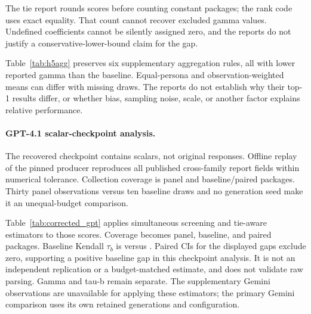The tie report rounds scores before counting constant packages; the rank code uses exact
equality. That count cannot recover excluded gamma values. Undefined coefficients cannot be
silently assigned zero, and the reports do not justify a conservative-lower-bound claim for the gap.

Table~\ref{tab:h5agg} preserves six supplementary aggregation rules, all with lower reported gamma
than the baseline. Equal-persona and observation-weighted means can differ with missing draws.
The reports do not establish why their top-1 results differ, or whether bias, sampling noise,
scale, or another factor explains relative performance.


\paragraph{GPT-4.1 scalar-checkpoint analysis.}
The recovered checkpoint contains scalars, not original responses. Offline replay of the pinned
producer reproduces all published cross-family report fields within numerical tolerance.
Collection coverage is \xfN{} panel and \xfPairedN{} baseline/paired packages.
Thirty panel observations versus ten baseline draws and no generation seed make it
an unequal-budget comparison.

Table~\ref{tab:corrected_gpt} applies simultaneous screening and tie-aware estimators to those scores.
Coverage becomes \correctedPanelN{} panel, \correctedBaseN{} baseline, and \correctedPairedN{}
paired packages. Baseline Kendall $\tau_b$ is \correctedBaseTau{} versus \correctedPanelTau{}.
Paired CIs for the displayed gaps exclude zero, supporting a positive baseline gap in this
checkpoint analysis. It is not an independent replication or a budget-matched estimate, and does not validate
raw parsing. Gamma and tau-b remain separate. The supplementary Gemini observations are unavailable for applying these estimators; the
primary Gemini comparison uses its own retained generations and configuration.

